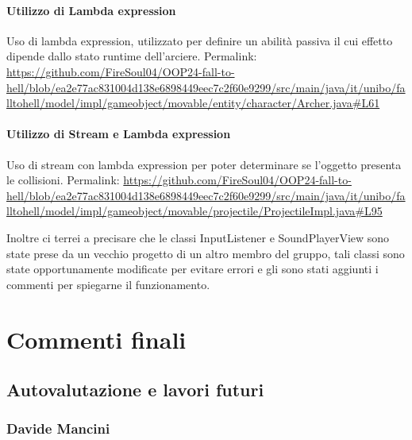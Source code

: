 \documentclass[a4paper,12pt]{report}
\begin{document}
\subsubsection{Utilizzo di Lambda expression}
Uso di lambda expression, utilizzato per definire un abilità passiva il cui effetto dipende dallo stato runtime dell’arciere. Permalink: \url{https://github.com/FireSoul04/OOP24-fall-to-hell/blob/ea2e77ac831004d138e6898449eec7c2f60e9299/src/main/java/it/unibo/falltohell/model/impl/gameobject/movable/entity/character/Archer.java#L61}

\subsubsection{Utilizzo di Stream e Lambda expression}
Uso di stream con lambda expression per poter determinare se l’oggetto presenta le collisioni. Permalink: \url{https://github.com/FireSoul04/OOP24-fall-to-hell/blob/ea2e77ac831004d138e6898449eec7c2f60e9299/src/main/java/it/unibo/falltohell/model/impl/gameobject/movable/projectile/ProjectileImpl.java#L95}

Inoltre ci terrei a precisare che le classi InputListener e SoundPlayerView sono state prese da un vecchio progetto di un altro membro del gruppo, tali classi sono state opportunamente modificate per evitare errori e gli sono stati aggiunti i commenti per spiegarne il funzionamento.

\chapter{Commenti finali}

\section{Autovalutazione e lavori futuri}

\subsection{Davide Mancini}
\end{document}
